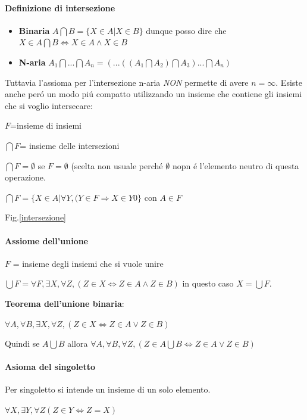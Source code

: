 \documentclass{article}
\begin{document}
\paragraph{Definizione di intersezione}
\begin{itemize}
    \item \textbf{Binaria} $A\bigcap B = \{ X\in A |X\in B\}$
    dunque posso dire che $X\in A\bigcap B \Leftrightarrow X\in A \land X\in B$
    \item \textbf{N-aria} $A_1\bigcap...\bigcap A_n = (...((A_1\bigcap A_2)\bigcap A_3)...\bigcap A_n)$
\end{itemize}
Tuttavia l'assioma per l'intersezione n-aria \textit{NON} permette di avere $n=\infty$.
Esiste anche peró un modo piú compatto utilizzando un insieme che contiene gli insiemi che si voglio intersecare:

\begin{center}
    $F$=insieme di insiemi
    
    $\bigcap F$= insieme delle intersezioni

    $\bigcap F = \emptyset$ se $F=\emptyset$  (scelta non usuale perché $\emptyset$ nopn é l'elemento neutro di questa operazione.

    $\bigcap F= \{X\in A | \forall Y, (Y\in F \Rightarrow X\in Y0\}$ con $A\in F$
\end{center}
Fig.\ref{intersezione}

\paragraph{Assiome dell'unione} 
\begin{center}
    $F$ = insieme degli insiemi che si vuole unire


    $\bigcup F= \forall F,\exists X, \forall Z,(Z\in X \Leftrightarrow Z\in A \land Z\in B)$ in questo caso $X=\bigcup F$.

\end{center}

\textbf{Teorema dell'unione binaria}: 
\begin{center}
    $\forall A, \forall B, \exists X, \forall Z,(Z\in X \Leftrightarrow Z\in A \lor Z\in B)$
\end{center}
Quindi se $A\bigcup B$ allora $\forall A, \forall B, \forall Z, (Z\in A\bigcup B \Leftrightarrow Z\in A \lor Z\in B)$

\paragraph{Asioma del singoletto} Per singoletto si intende un insieme di un solo elemento.
\begin{center}
    $\forall X,\exists Y,\forall Z(Z \in Y \Leftrightarrow Z = X)$
\end{center}
\end{document}
